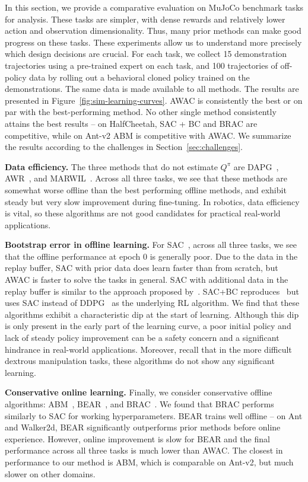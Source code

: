 In this section, we provide a comparative evaluation on MuJoCo benchmark tasks for analysis. These tasks are simpler, with dense rewards and relatively lower action and observation dimensionality. Thus, many prior methods can make good progress on these tasks. These experiments allow us to understand more precisely which design decisions are crucial. For each task, we collect 15 demonstration trajectories using a pre-trained expert on each task, and 100 trajectories of off-policy data by rolling out a behavioral cloned policy trained on the demonstrations. The same data is made available to all methods. The results are presented in Figure~\ref{fig:sim-learning-curves}. AWAC is consistently the best or on par with the best-performing method. No other single method consistently attains the best results -- on HalfCheetah, SAC + BC and BRAC are competitive, while on Ant-v2 ABM is competitive with AWAC.
We summarize the results according to the challenges in Section~\ref{sec:challenges}.

\textbf{Data efficiency.} The three methods that do not estimate $Q^\pi$ are DAPG~\citep{rajeswaran2018dextrous}, AWR~\citep{peng2019awr}, and MARWIL~\citep{wang2018marwil}. Across all three tasks, we see that these methods are somewhat worse offline than the best performing offline methods, and exhibit steady but very slow improvement during fine-tuning. In robotics, data efficiency is vital, so these algorithms are not good candidates for practical real-world applications.

\textbf{Bootstrap error in offline learning.} For SAC~\citep{haarnoja2018sac}, across all three tasks, we see that the offline performance at epoch 0 is generally poor. Due to the data in the replay buffer, SAC with prior data does learn faster than from scratch, but AWAC is faster to solve the tasks in general. SAC with additional data in the replay buffer is similar to the approach proposed by~\citet{vecerik17ddpgfd}. SAC+BC reproduces~\citet{nair2018demonstrations} but uses SAC instead of DDPG~\citep{lillicrap2015continuous} as the underlying RL algorithm. We find that these algorithms exhibit a characteristic dip at the start of learning. Although this dip is only present in the early part of the learning curve, a poor initial policy and lack of steady policy improvement can be a safety concern and a significant hindrance in real-world applications. Moreover, recall that in the more difficult dextrous manipulation tasks, these algorithms do not show any significant learning.

\textbf{Conservative online learning.} Finally, we consider  conservative offline algorithms: ABM~\citep{siegel2020abm}, BEAR~\citep{kumar19bear}, and BRAC~\citep{wu2019brac}. We found that BRAC performs similarly to SAC for working hyperparameters. BEAR trains well offline -- on Ant and Walker2d, BEAR significantly outperforms prior methods before online experience. However, online improvement is slow for BEAR and the final performance across all three tasks is much lower than AWAC. The closest in performance to our method is ABM, which is comparable on Ant-v2, but much slower on other domains. 

